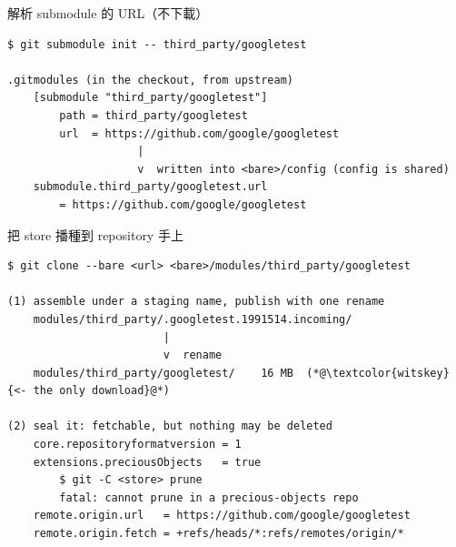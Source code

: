 \begin{frame}[fragile]{解析 submodule 的 URL（不下載）}
\begin{lstlisting}
$ git submodule init -- third_party/googletest

.gitmodules (in the checkout, from upstream)
    [submodule "third_party/googletest"]
        path = third_party/googletest
        url  = https://github.com/google/googletest
                    |
                    v  written into <bare>/config (config is shared)
    submodule.third_party/googletest.url
        = https://github.com/google/googletest
\end{lstlisting}

\end{frame}

\begin{frame}[fragile]{把 store 播種到 repository 手上}
\begin{lstlisting}
$ git clone --bare <url> <bare>/modules/third_party/googletest

(1) assemble under a staging name, publish with one rename
    modules/third_party/.googletest.1991514.incoming/
                        |
                        v  rename
    modules/third_party/googletest/    16 MB  (*@\textcolor{witskey}{<- the only download}@*)

(2) seal it: fetchable, but nothing may be deleted
    core.repositoryformatversion = 1
    extensions.preciousObjects   = true
        $ git -C <store> prune
        fatal: cannot prune in a precious-objects repo
    remote.origin.url   = https://github.com/google/googletest
    remote.origin.fetch = +refs/heads/*:refs/remotes/origin/*
\end{lstlisting}

\end{frame}

